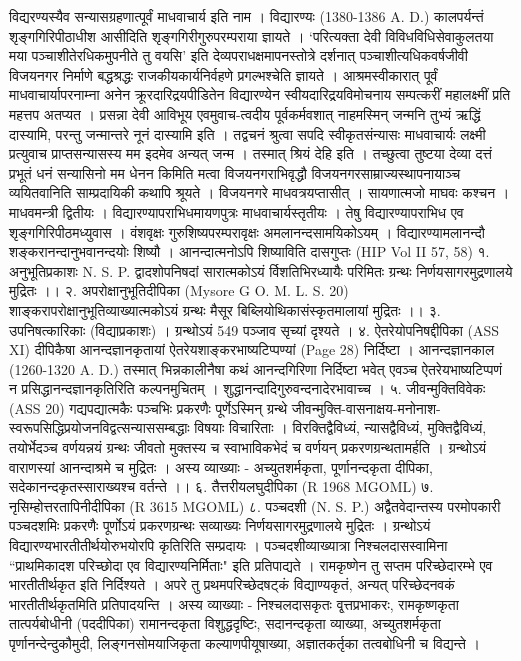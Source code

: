 विद्यरण्यस्यैव सन्यासग्रहणात्पूर्वं माधवाचार्य इति नाम । विद्यारण्यः (1380-1386 A. D.) कालपर्यन्तं शृङ्गगिरिपीठाधीश आसीदिति शृङ्गगिरीगुरुपरम्पराया ज्ञायते । `परित्यक्ता देवी विविधविधिसेवाकुलतया मया पञ्चाशीतेरधिकमुपनीते तु वयसि' इति देव्यपराधक्षमापनस्तोत्रे दर्शनात् पञ्चाशीत्यधिकवर्षजीवी विजयनगर निर्माणे बद्धश्रद्धः राजकीयकार्यनिर्वहणे प्रगल्भश्चेति ज्ञायते । आश्रमस्वीकारात् पूर्वं माधवाचार्यापरनाम्ना अनेन क्रूरदारिद्रयपीडितेन विद्यारण्येन स्वीयदारिद्रयविमोचनाय सम्पत्करीं महालक्ष्मीं प्रति महत्तप अतप्यत । प्रसन्ना देवी आविभूय एवमुवाच-त्वदीय पूर्वकर्मवशात् नाहमस्मिन् जन्मनि तुभ्यं ऋद्धिं दास्यामि, परन्तु जन्मान्तरे नूनं दास्यामि इति । तद्वचनं श्रुत्वा सपदि स्वीकृतसंन्यासः माधवाचार्यः लक्ष्मी प्रत्युवाच प्राप्तसन्यासस्य मम इदमेव अन्यत् जन्म । तस्मात् श्रियं देहि इति । तच्छुत्वा तुष्टया देव्या दत्तं प्रभूतं धनं सन्यासिनो मम धेनन किमिति मत्वा विजयनगराभिवृद्धौ विजयनगरसाम्राज्यस्थापनायाञ्च व्ययितवानिति साम्प्रदायिकी कथापि श्रूयते ।
विजयनगरे माधवत्रयप्तासीत् । सायणात्मजो माघवः कश्चन । माधवमन्त्री द्वितीयः । विद्यारण्यापराभिधमायणपुत्रः माधवाचार्यस्तृतीयः । तेषु विद्यारण्यापराभिध एव शृङ्गगिरिपीठमध्युवास ।
वंशवृक्षः
गुरुशिष्यपरम्परावृक्षः
अमलानन्दसामयिकोऽयम् । विद्यारण्यामलानन्दौ शङ्करानन्दानुभवानन्दयोः शिष्यौ । आनन्दात्मनोऽपि शिष्याविति दासगुप्तः (HIP Vol II 57, 58)
१. अनुभूतिप्रकाशः N. S. P.
द्वादशोपनिषदां सारात्मकोऽयं र्विशतिभिरध्यायैः परिमितः ग्रन्थः निर्णयसागरमुद्रणालये मुद्रितः ।।
२. अपरोक्षानुभूतिदीपिका (Mysore G O. M. L. S. 20)
शाङ्करापरोक्षानुभूतिव्याख्यात्मकोऽयं ग्रन्थः मैसूर बिब्लियोथिकासंस्कृतमालायां मुद्रितः ।।
३. उपनिषत्कारिकाः (विद्याप्रकाशः) ।
ग्रन्थोऽयं 549 पञ्जाव सृच्यां दृश्यते ।
४. ऐतरेयोपनिषद्दीपिका (ASS XI)
दीपिकैषा आनन्दज्ञानकृतायां ऐतरेयशाङ्करभाष्यटिप्पण्यां (Page 28) निर्दिष्टा । आनन्दज्ञानकाल (1260-1320 A. D.) तस्मात् भिन्नकालीनैषा कथं आनन्दगिरिणा निर्दिष्टा भवेत् एवञ्च ऐतरेयभाष्यटिप्पणं न प्रसिद्धानन्दज्ञानकृतिरिति कल्पनमुचितम् । शुद्धानन्दादिगुरुवन्दनादेरभावाच्च ।
५. जीवन्मुक्तिविवेकः (ASS 20)
गद्यपद्यात्मकैः पञ्चभिः प्रकरणैः पूर्णेऽस्मिन् ग्रन्थे जीवन्मुक्ति-वासनाक्षय-मनोनाश-स्वरूपसिद्धिप्रयोजनविद्वत्सन्याससम्बद्धाः विषयाः विचारिताः । विरक्तिद्वैविध्यं, न्यासद्वैविध्यं, मुक्तिद्वैविध्यं, तयोर्भेदञ्च वर्णयन्नयं ग्रन्थः जीवतो मुक्तस्य च स्वाभाविकभेदं च वर्णयन् प्रकरणग्रन्थतामर्हति । ग्रन्थोऽयं वाराणस्यां आनन्दाश्रमे च मुद्रितः । अस्य व्याख्याः - अच्युतशर्मकृता, पूर्णानन्दकृता दीपिका, सदेकानन्दकृतस्साराख्यश्च वर्तन्ते ।।
६. तैत्तरीयलघुदीपिका (R 1968 MGOML)
७. नृसिम्होत्तरतापिनीदीपिका (R 3615 MGOML)
८. पञ्चदशी (N. S. P.)
अद्वैतवेदान्तस्य परमोपकारी पञ्चदशमिः प्रकरणैः पूर्णोऽयं प्रकरणग्रन्थः सव्याख्यः निर्णयसागरमुद्रणालये मुद्रितः । ग्रन्थोऽयं विद्यारण्यभारतीतीर्थयोरुभयोरपि कृतिरिति सम्प्रदायः । पञ्चदशीव्याख्यात्रा निश्चलदासस्वामिना ``प्राथमिकादश परिच्छोदा एव विद्यारण्यनिर्मिताः" इति प्रतिपाद्यते । रामकृष्णेन तु सप्तम परिच्छेदारम्भे एव भारतीतीर्थकृत इति निर्दिश्यते । अपरे तु प्रथमपरिच्छेदषट्कं विद्याण्यकृतं, अन्यत् परिच्छेदनवकं भारतीतीर्थकृतमिति प्रतिपादयन्ति । अस्य व्याख्याः - निश्चलदासकृतः वृ्त्तप्रभाकरः, रामकृष्णकृता तात्पर्यबोधीनी (पददीपिका) रामानन्दकृता विशुद्धदृष्टिः, सदानन्दकृता व्याख्या, अच्युतशर्मकृता पृर्णानन्देन्दुकौमुदी, लिङ्गनसोमयाजिकृता कल्याणपीयूषाख्या, अज्ञातकर्तृका तत्वबोधिनी च विद्यन्ते ।
